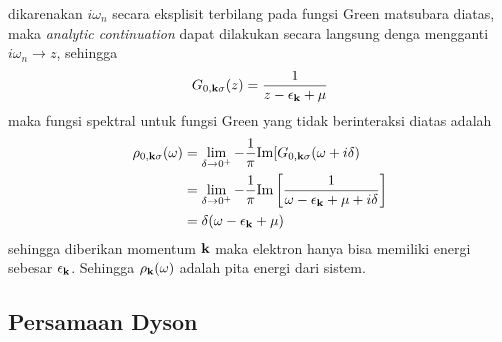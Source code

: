 dikarenakan $i\omega_n$ secara eksplisit terbilang pada fungsi Green matsubara diatas, maka \textit{analytic continuation} dapat dilakukan secara langsung denga mengganti $i\omega_n \rightarrow z$, sehingga
\begin{align}
G_{0,\textbf{k}\sigma}(z) = \frac{1}{z - \epsilon_{\textbf{k}} + \mu}
\end{align}
maka fungsi spektral untuk fungsi Green yang tidak berinteraksi diatas adalah 
\begin{align}
\rho_{0,\textbf{k}\sigma}(\omega) &= \lim_{\delta \rightarrow 0^+} - \frac{1}{\pi} \text{Im} [G_{0,\textbf{k}\sigma}(\omega + i\delta) \notag\\
&= \lim_{\delta \rightarrow 0^+} - \frac{1}{\pi} \text{Im} \left[ \frac{1}{\omega - \epsilon_{\textbf{k}} + \mu + i\delta} \right]\notag\\
&= \delta(\omega - \epsilon_{\textbf{k}} + \mu)
\end{align}
sehingga diberikan momentum $\textbf{k}$ maka elektron hanya bisa memiliki energi sebesar $\epsilon_{\textbf{k}}$. Sehingga $\rho_{\textbf{k}}(\omega)$ adalah pita energi dari sistem.

\subsection{Persamaan Dyson}

